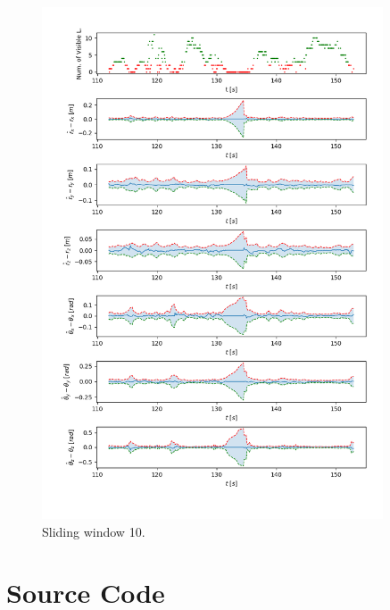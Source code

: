 \documentclass[a4paper]{article}
\begin{document}
\begin{figure}[H]
    \centering
    \includegraphics[width=0.9\textwidth]{code/sliding_window_10.png}
    \caption{Sliding window 10.}
    \label{fig:5c}
\end{figure}


\clearpage
\printbibliography

\appendix

\clearpage
\section{Source Code}
\label{sourcecode}
\end{document}
